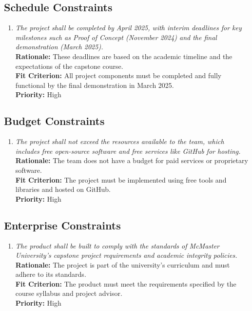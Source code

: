 \documentclass[12pt]{article}
\begin{document}
\subsection{Schedule Constraints}
\begin{enumerate}[label=SCHD \arabic*., wide=0pt, leftmargin=*]
  \item \emph{The project shall be completed by April 2025, with
      interim deadlines for key milestones such as Proof of Concept
    (November 2024) and the final demonstration (March 2025).}\\[2mm]
    {\bf Rationale:} These deadlines are based on the academic
    timeline and the expectations of the capstone course.\\
    {\bf Fit Criterion:} All project components must be completed and
    fully functional by the final demonstration in March 2025.\\
    {\bf Priority:} High
\end{enumerate}
\subsection{Budget Constraints}
\begin{enumerate}[label=BDGT \arabic*., wide=0pt, leftmargin=*]
  \item \emph{The project shall not exceed the resources available to
      the team, which includes free open-source software and free
    services like GitHub for hosting.}\\[2mm]
    {\bf Rationale:} The team does not have a budget for paid
    services or proprietary software.\\
    {\bf Fit Criterion:} The project must be implemented using free
    tools and libraries and hosted on GitHub.\\
    {\bf Priority:} High
\end{enumerate}
\subsection{Enterprise Constraints}
\begin{enumerate}[label=ENTP \arabic*., wide=0pt, leftmargin=*]
  \item \emph{The product shall be built to comply with the standards
      of McMaster University’s capstone project requirements and
    academic integrity policies.}\\[2mm]
    {\bf Rationale:} The project is part of the university’s
    curriculum and must adhere to its standards.\\
    {\bf Fit Criterion:} The product must meet the requirements
    specified by the course syllabus and project advisor.\\
    {\bf Priority:} High
\end{enumerate}
\end{document}
